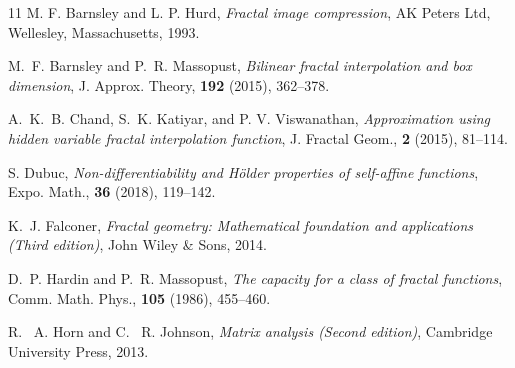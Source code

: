 \documentclass[11pt]{amsart}
\theoremstyle{definition}
\theoremstyle{remark}
\numberwithin{equation}{section}
\newcommand{\bR}{{\mathbb R}}
\begin{document}
\begin{thebibliography}{11}
	{\sc M. F. Barnsley and L. P. Hurd}, {\em Fractal image compression},
AK Peters Ltd, Wellesley, Massachusetts, 1993.

 {\sc M.~F. Barnsley and P.~R. Massopust}, {\em Bilinear fractal interpolation and box dimension}, J. Approx. Theory, {\bf 192} (2015), 362--378.





{\sc A.~K.~B. Chand, S.~K. Katiyar, and P. V. Viswanathan}, {\em Approximation using hidden variable fractal interpolation function},
J. Fractal Geom., \textbf{2} (2015), 81--114.


{\sc S. Dubuc},
{\em Non-differentiability and Hölder properties of self-affine functions}, 
Expo. Math., \textbf{36} (2018), 119--142.

 {\sc K.~J. Falconer}, {\em Fractal geometry: Mathematical foundation and applications (Third edition)}, John Wiley \& Sons, 2014.





 {\sc D.~P. Hardin and P.~R. Massopust}, {\em The capacity for a class of fractal functions},
Comm. Math. Phys., {\bf 105} (1986), 455--460.

 {\sc R. ~A. Horn and C. ~R. Johnson}, {\em Matrix analysis (Second edition)}, Cambridge University Press, 2013.


\end{thebibliography}
\end{document}
